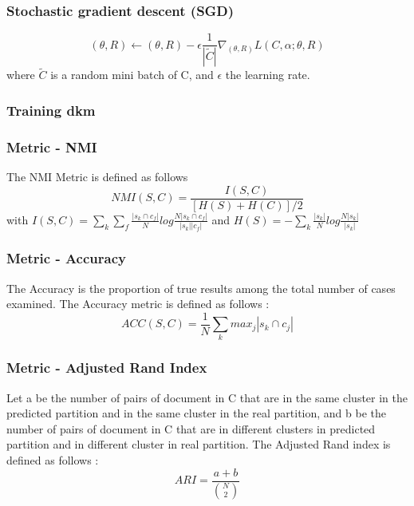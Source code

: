 \documentclass{beamer}
\begin{document}
\begin{frame}
\frametitle{Stochastic gradient descent (SGD)}
\begin{equation*}
  (\theta, R) \gets (\theta, R) - \epsilon \frac{1}{|\widetilde{C}|}
  \nabla_{(\theta, R)} L(C, \alpha; \theta, R)
\end{equation*}
where $\widetilde{C}$ is a random mini batch of C, and $\epsilon$ the
learning rate.
\end{frame}
\begin{frame}
\frametitle{Training dkm}
\end{frame}

\begin{frame}
\frametitle{Metric - NMI}
The NMI Metric is defined as follows
$$NMI(S,C) = \frac{I(S,C)}{[H(S)+H(C)]/2}$$ 
with
$I(S,C) =\sum_k \sum_f\frac{|s_k \cap c_f|}{N}log\frac{N|s_k \cap c_f|}{|s_k| |c_f|}$
and
$H(S) = -\sum_k\frac{|s_k|}{N}log\frac{N|s_k|}{|s_k|}$
\end{frame}

\begin{frame}
\frametitle{Metric - Accuracy}
The Accuracy is the proportion of true results among the total
  number of cases examined. The Accuracy metric is defined as follows :
$$ACC(S,C) = \frac{1}{N}\sum_k {max}_j|s_k \cap c_j|$$
\end{frame}

\begin{frame}
\frametitle{Metric - Adjusted Rand Index}
Let a be the number of pairs of document in C
  that are in the same cluster in the predicted partition and in the
  same cluster in the real partition, and b be the number of pairs of
  document in C that are in different clusters in predicted partition
  and in different cluster in real partition.
  The Adjusted Rand index is defined as follows :
  $$ARI = \frac{a+b}{\binom{N}{2}}$$
\end{frame}
\end{document}
